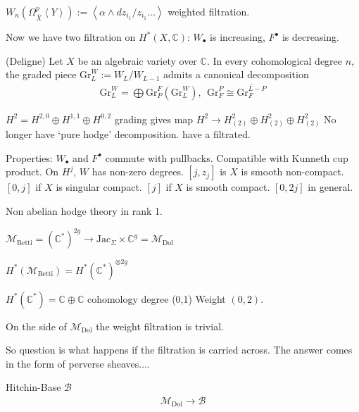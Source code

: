 \begin{definition}
    $W_n ( \Omega_{\bar{X}} ^p \left< Y \right> ) := \left< \alpha \wedge dz_{i_1} / z_{i_1} ... \right> $ 
    weighted filtration. 
\end{definition}

Now we have two filtration on $H^* ( X, \mathbb{C} ) $: $ W_\bullet $ is increasing, $ F^\bullet $ is decreasing. 

\begin{theorem}
    (Deligne)  Let $ X $ be an algebraic variety over $ \mathbb{C} $. 
    In every cohomological degree $n$, 
    the graded piece $ \mathrm{Gr}_L ^W := W_L / W_{L-1 } $ 
    admits a canonical decomposition 
    \begin{align}
        \mathrm{Gr}_{L} ^{W} = \bigoplus \mathrm{Gr}_{P} ^{F} (\mathrm{Gr}_{L} ^{W}) , ~~ \mathrm{Gr}_{F} ^{P} \cong \overline{\mathrm{Gr}_{F} ^{L-P}}
    \end{align}
\end{theorem}

$H^2 = H^{2,0} \oplus H^{1,1} \oplus H^{0,2} $ 
grading gives map $ H^2 \rightarrow   H^2 _{(2) } \oplus  H^2 _{(2) }\oplus   H^2 _{(2) } $ 
No longer have `pure hodge' decomposition. 
have a filtrated. 

Properties:
$ W_\bullet $ and $ F^\bullet $ commute with pullbacks. 
Compatible with Kunneth cup product. 
On $H^j $, $ W $ has non-zero degrees. 
$[j, z_j ] $ is $ X $ is smooth non-compact. 
$[ 0, j ] $ if $ X $ is singular compact.
$[ j ] $ if $ X $ is  smooth compact. 
$[ 0, 2j ] $ in general. 

Non abelian hodge theory in rank 1. 

$ \mathcal{M}_{\mathrm{Betti}} = ( \mathbb{C} ^* ) ^{2g} \rightarrow  \mathrm{Jac} _\Sigma \times \mathbb{C}  ^g = \mathcal{M}_{\mathrm{Dol}} $ 

$H^* ( \mathcal{M}_{\mathrm{Betti}}) = H^* ( \mathbb{C} ^* ) ^{\otimes 2g} $ 

$ H^*( \mathbb{C} ^* ) = \mathbb{C} \oplus \mathbb{C}  $ 
cohomology degree (0,1) 
Weight $( 0, 2) $. 

On the side of $\mathcal{M}_{\mathrm{Dol}}$ the weight filtration is trivial. 

So question is what happens if the filtration is carried across. 
The answer comes in the form of perverse sheaves.... 

Hitchin-Base  $\mathcal{B} $ 
\begin{align}
    \mathcal{M}_{\mathrm{Dol}} \rightarrow  \mathcal{B} 
\end{align}

